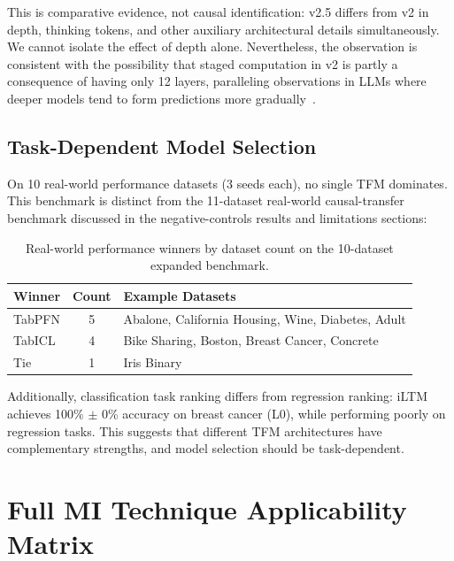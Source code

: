 \documentclass{article}
\begin{document}
This is comparative evidence, not causal identification: v2.5 differs from v2 in depth, thinking tokens, and other auxiliary architectural details simultaneously. We cannot isolate the effect of depth alone. Nevertheless, the observation is consistent with the possibility that staged computation in v2 is partly a consequence of having only 12 layers, paralleling observations in LLMs where deeper models tend to form predictions more gradually~\cite{nostalgebraist2020logitlens}.

\subsection{Task-Dependent Model Selection}

On 10 real-world performance datasets (3 seeds each), no single TFM dominates. This benchmark is distinct from the 11-dataset real-world causal-transfer benchmark discussed in the negative-controls results and limitations sections:

\begin{table}[t]
\centering
\caption{Real-world performance winners by dataset count on the 10-dataset expanded benchmark.}
\label{tab:realworld-winners}
\begin{tabular}{l c l}
\toprule
Winner & Count & Example Datasets \\
\midrule
TabPFN & 5 & Abalone, California Housing, Wine, Diabetes, Adult \\
TabICL & 4 & Bike Sharing, Boston, Breast Cancer, Concrete \\
Tie & 1 & Iris Binary \\
\bottomrule
\end{tabular}
\end{table}

Additionally, classification task ranking differs from regression ranking: iLTM achieves 100\% $\pm$ 0\% accuracy on breast cancer (L0), while performing poorly on regression tasks. This suggests that different TFM architectures have complementary strengths, and model selection should be task-dependent.

\section{Full MI Technique Applicability Matrix}
\label{app:mi-full}
\end{document}
